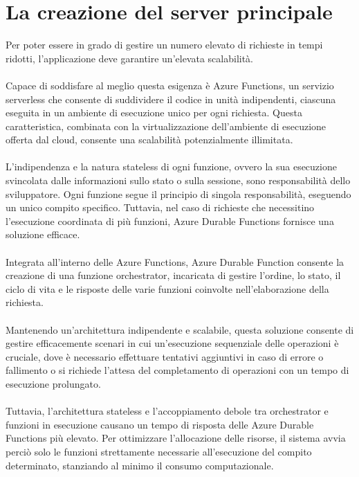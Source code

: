 \section{La creazione del server principale}

Per poter essere in grado di gestire un numero elevato di richieste in tempi ridotti, l’applicazione deve garantire un’elevata scalabilità.\\
\\
Capace di soddisfare al meglio questa esigenza è Azure Functions, un servizio serverless che consente di suddividere il codice in unità indipendenti,
ciascuna eseguita in un ambiente di esecuzione unico per ogni richiesta.
Questa caratteristica, combinata con la virtualizzazione dell’ambiente di esecuzione offerta dal cloud, consente una scalabilità potenzialmente illimitata.\\
\\
L’indipendenza e la natura stateless di ogni funzione, ovvero la sua esecuzione svincolata dalle informazioni sullo stato o sulla sessione, sono responsabilità dello sviluppatore.
Ogni funzione segue il principio di singola responsabilità, eseguendo un unico compito specifico.
Tuttavia, nel caso di richieste che necessitino l’esecuzione coordinata di più funzioni, Azure Durable Functions fornisce una soluzione efficace.\\
\\
Integrata all’interno delle Azure Functions, Azure Durable Function consente la creazione di una funzione orchestrator,
incaricata di gestire l’ordine, lo stato, il ciclo di vita e le risposte delle varie funzioni coinvolte nell’elaborazione della richiesta.\\
\\
Mantenendo un'architettura indipendente e scalabile, questa soluzione consente di gestire efficacemente scenari in cui un’esecuzione sequenziale delle operazioni è cruciale,
dove è necessario effettuare tentativi aggiuntivi in caso di errore o fallimento o si richiede l'attesa del completamento di operazioni con un tempo di esecuzione prolungato.\\
\\
Tuttavia, l'architettura stateless e l’accoppiamento debole tra orchestrator e funzioni in esecuzione causano un tempo di risposta delle Azure Durable Functions più elevato.
Per ottimizzare l’allocazione delle risorse, il sistema avvia perciò solo le funzioni strettamente necessarie all’esecuzione del compito determinato,
stanziando al minimo il consumo computazionale.
\clearpage

